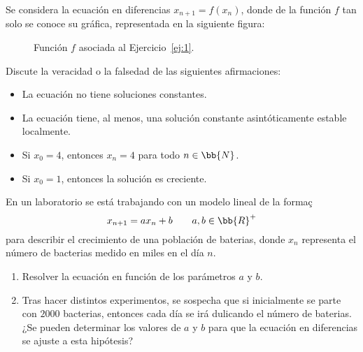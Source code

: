 \documentclass[12pt]{article}
\begin{document}
    \begin{ejercicio} \label{ej:1} Se considera la ecuación en diferencias $x_{n+1} = f(x_n)$, donde de la función $f$ tan solo se conoce su gráfica,
        representada en la siguiente figura:
        \begin{figure}[H]
            \centering
            \caption{Función $f$ asociada al Ejercicio~\ref{ej:1}.}
        \end{figure}

        Discute la veracidad o la falsedad de las siguientes afirmaciones:
        \begin{itemize}
            \item La ecuación no tiene soluciones constantes.
            \item La ecuación tiene, al menos, una solución constante asintóticamente estable localmente.
            \item Si $x_0=4$, entonces $x_n=4$ para todo $n\in\bb{N}$.
            \item Si $x_0=1$, entonces la solución es creciente.
        \end{itemize}

    \end{ejercicio}



    \begin{ejercicio}
        En un laboratorio se está trabajando con un modelo lineal de la formaç
        \begin{equation*}
            x_{n+1} = ax_n +b \qquad a,b\in \bb{R}^+
        \end{equation*} 
        para describir el crecimiento de una población de baterias, donde $x_n$ representa el número de bacterias medido en miles en el día $n$.
        \begin{enumerate}
            \item Resolver la ecuación en función de los parámetros $a$ y $b$.
            \item Tras hacer distintos experimentos, se sospecha que si inicialmente se parte con $2000$ bacterias, entonces cada día se irá dulicando el número de baterias.
            ¿Se pueden determinar los valores de $a$ y $b$ para que la ecuación en diferencias se ajuste a esta hipótesis?
        \end{enumerate}
    \end{ejercicio}
\end{document}
